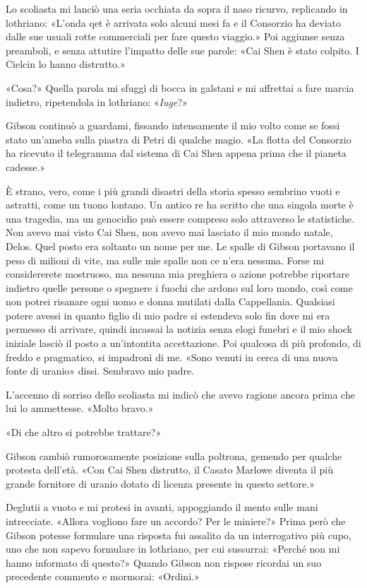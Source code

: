 Lo scoliasta mi lanciò una seria occhiata da sopra il naso ricurvo,
replicando in lothriano: «L'onda \foreignlanguage{italian}{qet} è
arrivata solo alcuni mesi fa e il Consorzio ha deviato dalle sue usuali
rotte commerciali per fare questo viaggio.» Poi aggiunse senza
preamboli, e senza attutire l'impatto delle sue parole: «Cai Shen è
stato colpito. I Cielcin lo hanno distrutto.»

«Cosa?» Quella parola mi sfuggì di bocca in galstani e mi affrettai a
fare marcia indietro, ripetendola in lothriano: «\emph{Iuge}?»

Gibson continuò a guardami, fissando intensamente il mio volto come se
fossi stato un'ameba sulla piastra di Petri di qualche magio. «La flotta
del Consorzio ha ricevuto il telegramma dal sistema di Cai Shen appena
prima che il pianeta cadesse.»

È strano, vero, come i più grandi disastri della storia spesso sembrino
vuoti e astratti, come un tuono lontano. Un antico re ha scritto che una
singola morte è una tragedia, ma un genocidio può essere compreso solo
attraverso le statistiche. Non avevo mai visto Cai Shen, non avevo mai
lasciato il mio mondo natale, Delos. Quel posto era soltanto un nome per
me. Le spalle di Gibson portavano il peso di milioni di vite, ma sulle
mie spalle non ce n'era nessuna. Forse mi considererete mostruoso, ma
nessuna mia preghiera o azione potrebbe riportare indietro quelle
persone o spegnere i fuochi che ardono sul loro mondo, così come non
potrei risanare ogni uomo e donna mutilati dalla Cappellania. Qualsiasi
potere avessi in quanto figlio di mio padre si estendeva solo fin dove
mi era permesso di arrivare, quindi incassai la notizia senza elogi
funebri e il mio shock iniziale lasciò il posto a un'intontita
accettazione. Poi qualcosa di più profondo, di freddo e pragmatico, si
impadronì di me. «Sono venuti in cerca di una nuova fonte di uranio»
dissi. Sembravo mio padre.

L'accenno di sorriso dello scoliasta mi indicò che avevo ragione ancora
prima che lui lo ammettesse. «Molto bravo.»

«Di che altro si potrebbe trattare?»

Gibson cambiò rumorosamente posizione sulla poltrona, gemendo per
qualche protesta dell'età. «Con Cai Shen distrutto, il Casato Marlowe
diventa il più grande fornitore di uranio dotato di licenza presente in
questo settore.»

Deglutii a vuoto e mi protesi in avanti, appoggiando il mento sulle mani
intrecciate. «Allora vogliono fare un accordo? Per le miniere?» Prima
però che Gibson potesse formulare una risposta fui assalito da un
interrogativo più cupo, uno che non sapevo formulare in lothriano, per
cui sussurrai: «Perché non mi hanno informato di questo?» Quando Gibson
non rispose ricordai un suo precedente commento e mormorai: «Ordini.»

